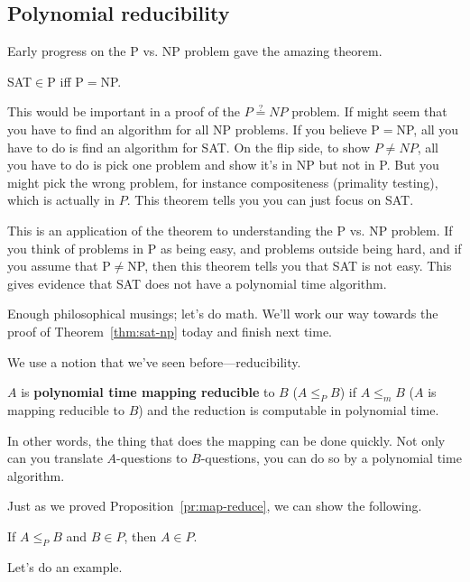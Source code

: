 \subsection{Polynomial reducibility}
Early progress on the P vs. NP problem gave the amazing theorem.
\begin{thm}
SAT$\in $P iff P$=$NP.
\end{thm}
This would be important in a proof of the $P\stackrel?=NP$ problem. If might seem that you have to find an algorithm for all NP problems. If you believe P$=$NP, all you have to do is find an algorithm for SAT. On the flip side, to show $P\ne NP$, all you have to do is pick one problem and show it's in NP but not in P. But you might pick the wrong problem, for instance compositeness (primality testing), which is actually in $P$. This theorem tells you you can just focus on SAT.

This is an application of the theorem to understanding the P vs. NP problem. If you think of problems in P as being easy, and problems outside being hard, and if you assume that P$\ne$NP, then this theorem tells you that SAT is not easy. This gives evidence that SAT does not have a polynomial time algorithm. 

Enough philosophical musings; let's do math. We'll work our way towards the proof of Theorem~\ref{thm:sat-np} today and finish next time.

We use a notion that we've seen before---reducibility.

\begin{df}
$A$ is \textbf{polynomial time mapping reducible} to $B$ ($A\le_PB$) if $A\le_m B$ ($A$ is mapping reducible to $B$) and the reduction is computable in polynomial time.
\end{df}
In other words, the thing that does the mapping can be done quickly. Not only can you translate $A$-questions to $B$-questions, you can do so by a polynomial time algorithm.

Just as we proved Proposition~\ref{pr:map-reduce}, we can show the following.
\begin{thm}
If $A\le_P B$ and $B\in P$, then $A\in P$.
\end{thm}
Let's do an example. 
